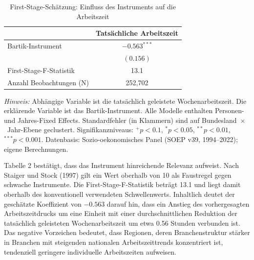 \documentclass[12pt,a4paper]{article}
\begin{document}
\begin{table}[H]
\centering
\caption{First-Stage-Schätzung: Einfluss des Instruments auf die Arbeitszeit}
\begin{threeparttable}
\begin{tabularx}{\textwidth}{l c}
\toprule
 & \textbf{Tatsächliche Arbeitszeit} \\
\midrule
Bartik-Instrument & $-0.563^{***}$ \\
 & $(0.156)$ \\
First-Stage-F-Statistik & 13.1 \\
Anzahl Beobachtungen (N) & 252,702 \\
\bottomrule
\end{tabularx}
\begin{tablenotes}
\footnotesize
\item \textit{Hinweis:} Abhängige Variable ist die tatsächlich geleistete Wochenarbeitszeit. Die erklärende Variable ist das Bartik-Instrument. Alle Modelle enthalten Personen- und Jahres-Fixed Effects. Standardfehler (in Klammern) sind auf Bundesland~$\times$~Jahr-Ebene geclustert. Signifikanzniveaus: $^{+}p<0.1$, $^{*}p<0.05$, $^{**}p<0.01$, $^{***}p<0.001$. Datenbasis: Sozio-oekonomisches Panel (SOEP v39, 1994--2022); eigene Berechnungen.
\end{tablenotes}
\end{threeparttable}
\end{table}

Tabelle 2 bestätigt, dass das Instrument hinreichende Relevanz aufweist. Nach Staiger und Stock (1997) gilt ein Wert oberhalb von 10 als Faustregel gegen schwache Instrumente. Die First-Stage-F-Statistik beträgt 13.1 und liegt damit oberhalb des konventionell verwendeten Schwellenwerts. Inhaltlich deutet der geschätzte Koeffizient von $-0{.}563$ darauf hin, dass ein Anstieg des vorhergesagten Arbeitszeitdrucks um eine Einheit mit einer durchschnittlichen Reduktion der tatsächlich geleisteten Wochenarbeitszeit um etwa 0{.}56 Stunden verbunden ist. Das negative Vorzeichen bedeutet, dass Regionen, deren Branchenstruktur stärker in Branchen mit steigenden nationalen Arbeitszeittrends konzentriert ist, tendenziell geringere individuelle Arbeitszeiten aufweisen.
\end{document}
